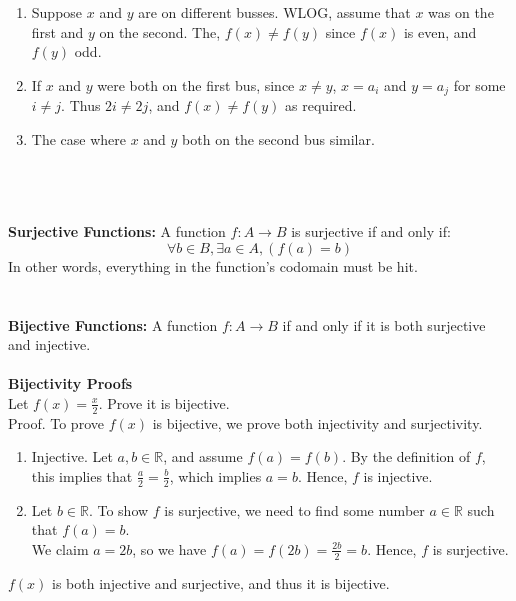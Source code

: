 \documentclass{article}
\begin{document}
\begin{enumerate}
    \item Suppose $x$ and $y$ are on different busses. WLOG, assume that $x$ was on the first and $y$ on the second. The, $f(x) \neq f(y)$ since $f(x)$ is even, and $f(y)$ odd.
    \item If $x$ and $y$ were both on the first bus, since $x \neq y$, $x = a_i$ and $y = a_j$ for some $i \neq j$. Thus $2i \neq 2j$, and $f(x) \neq f(y)$ as required.
    \item The case where $x$ and $y$ both on the second bus similar.
\end{enumerate}
\\
\\
\\
\textbf{Surjective Functions: } A function $f: A \rightarrow B$ is surjective if and only if:
$$\forall b \in B, \exists a \in A, (f(a) = b)$$
In other words, everything in the function's codomain must be hit.
\\
\\
\\
\textbf{Bijective Functions: } A function $f: A \rightarrow B$ if and only if it is both surjective and injective.\\
\\
\textbf{Bijectivity Proofs}\\
Let $f(x) = \frac{x}{2}$. Prove it is bijective.\\
Proof. To prove $f(x)$ is bijective, we prove both injectivity and surjectivity.
\begin{enumerate}
    \item Injective. Let $a, b \in \mathbb{R}$, and assume $f(a) = f(b)$. By the definition of $f$, this implies that $\frac{a}{2} = \frac{b}{2}$, which implies $a = b$. Hence, $f$ is injective.
    \item Let $b \in \mathbb{R}$. To show $f$ is surjective, we need to find some number $a \in \mathbb{R}$ such that $f(a) = b$.\\
    We claim $a = 2b$, so we have $f(a) = f(2b) = \frac{2b}{2} = b$. Hence, $f$ is surjective.
\end{enumerate}
$f(x)$ is both injective and surjective, and thus it is bijective.
\end{document}
